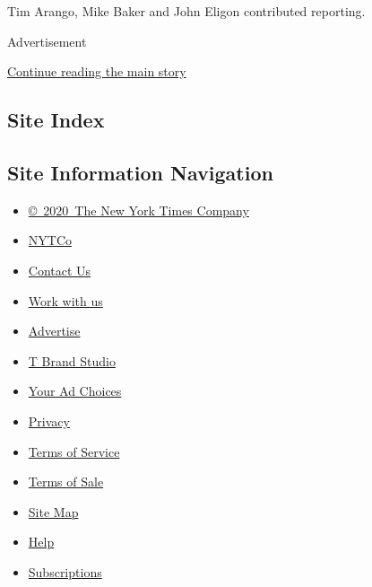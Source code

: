 Tim Arango, Mike Baker and John Eligon contributed reporting.

Advertisement

\protect\hyperlink{after-bottom}{Continue reading the main story}

\hypertarget{site-index}{%
\subsection{Site Index}\label{site-index}}

\hypertarget{site-information-navigation}{%
\subsection{Site Information
Navigation}\label{site-information-navigation}}

\begin{itemize}
\tightlist
\item
  \href{https://help.nytimes3xbfgragh.onion/hc/en-us/articles/115014792127-Copyright-notice}{©~2020~The
  New York Times Company}
\end{itemize}

\begin{itemize}
\tightlist
\item
  \href{https://www.nytco.com/}{NYTCo}
\item
  \href{https://help.nytimes3xbfgragh.onion/hc/en-us/articles/115015385887-Contact-Us}{Contact
  Us}
\item
  \href{https://www.nytco.com/careers/}{Work with us}
\item
  \href{https://nytmediakit.com/}{Advertise}
\item
  \href{http://www.tbrandstudio.com/}{T Brand Studio}
\item
  \href{https://www.nytimes3xbfgragh.onion/privacy/cookie-policy\#how-do-i-manage-trackers}{Your
  Ad Choices}
\item
  \href{https://www.nytimes3xbfgragh.onion/privacy}{Privacy}
\item
  \href{https://help.nytimes3xbfgragh.onion/hc/en-us/articles/115014893428-Terms-of-service}{Terms
  of Service}
\item
  \href{https://help.nytimes3xbfgragh.onion/hc/en-us/articles/115014893968-Terms-of-sale}{Terms
  of Sale}
\item
  \href{https://spiderbites.nytimes3xbfgragh.onion}{Site Map}
\item
  \href{https://help.nytimes3xbfgragh.onion/hc/en-us}{Help}
\item
  \href{https://www.nytimes3xbfgragh.onion/subscription?campaignId=37WXW}{Subscriptions}
\end{itemize}
